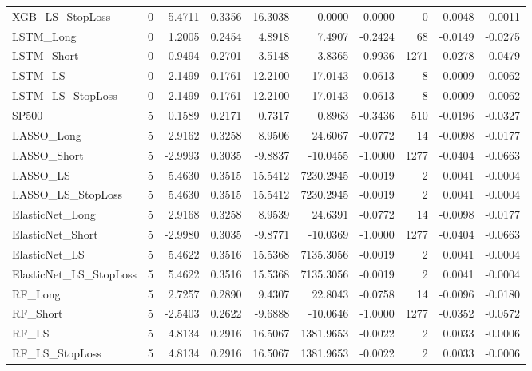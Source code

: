 \begin{tabular}{llrrrrrrrr}
\cline{1-10}
XGB\_LS\_StopLoss & 0 & 5.4711 & 0.3356 & 16.3038 & 0.0000 & 0.0000 & 0 & 0.0048 & 0.0011 \\
\cline{1-10}
LSTM\_Long & 0 & 1.2005 & 0.2454 & 4.8918 & 7.4907 & -0.2424 & 68 & -0.0149 & -0.0275 \\
\cline{1-10}
LSTM\_Short & 0 & -0.9494 & 0.2701 & -3.5148 & -3.8365 & -0.9936 & 1271 & -0.0278 & -0.0479 \\
\cline{1-10}
LSTM\_LS & 0 & 2.1499 & 0.1761 & 12.2100 & 17.0143 & -0.0613 & 8 & -0.0009 & -0.0062 \\
\cline{1-10}
LSTM\_LS\_StopLoss & 0 & 2.1499 & 0.1761 & 12.2100 & 17.0143 & -0.0613 & 8 & -0.0009 & -0.0062 \\
\cline{1-10}
SP500 & 5 & 0.1589 & 0.2171 & 0.7317 & 0.8963 & -0.3436 & 510 & -0.0196 & -0.0327 \\
\cline{1-10}
LASSO\_Long & 5 & 2.9162 & 0.3258 & 8.9506 & 24.6067 & -0.0772 & 14 & -0.0098 & -0.0177 \\
\cline{1-10}
LASSO\_Short & 5 & -2.9993 & 0.3035 & -9.8837 & -10.0455 & -1.0000 & 1277 & -0.0404 & -0.0663 \\
\cline{1-10}
LASSO\_LS & 5 & 5.4630 & 0.3515 & 15.5412 & 7230.2945 & -0.0019 & 2 & 0.0041 & -0.0004 \\
\cline{1-10}
LASSO\_LS\_StopLoss & 5 & 5.4630 & 0.3515 & 15.5412 & 7230.2945 & -0.0019 & 2 & 0.0041 & -0.0004 \\
\cline{1-10}
ElasticNet\_Long & 5 & 2.9168 & 0.3258 & 8.9539 & 24.6391 & -0.0772 & 14 & -0.0098 & -0.0177 \\
\cline{1-10}
ElasticNet\_Short & 5 & -2.9980 & 0.3035 & -9.8771 & -10.0369 & -1.0000 & 1277 & -0.0404 & -0.0663 \\
\cline{1-10}
ElasticNet\_LS & 5 & 5.4622 & 0.3516 & 15.5368 & 7135.3056 & -0.0019 & 2 & 0.0041 & -0.0004 \\
\cline{1-10}
ElasticNet\_LS\_StopLoss & 5 & 5.4622 & 0.3516 & 15.5368 & 7135.3056 & -0.0019 & 2 & 0.0041 & -0.0004 \\
\cline{1-10}
RF\_Long & 5 & 2.7257 & 0.2890 & 9.4307 & 22.8043 & -0.0758 & 14 & -0.0096 & -0.0180 \\
\cline{1-10}
RF\_Short & 5 & -2.5403 & 0.2622 & -9.6888 & -10.0646 & -1.0000 & 1277 & -0.0352 & -0.0572 \\
\cline{1-10}
RF\_LS & 5 & 4.8134 & 0.2916 & 16.5067 & 1381.9653 & -0.0022 & 2 & 0.0033 & -0.0006 \\
\cline{1-10}
RF\_LS\_StopLoss & 5 & 4.8134 & 0.2916 & 16.5067 & 1381.9653 & -0.0022 & 2 & 0.0033 & -0.0006 \\

\end{tabular}
